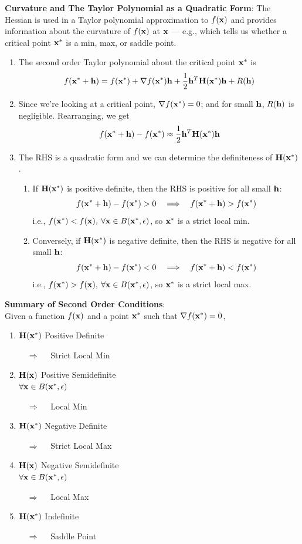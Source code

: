 \documentclass[20pt]{extarticle}
\newcommand{\be}{\begin{enumerate}}
\newcommand{\ee}{\end{enumerate}}
\newcommand{\lra}{\Longrightarrow}
\newcommand{\pbt}{\parbox[t]{2in}}
\newcommand{\eps}{\epsilon}
\newcommand{\bfx}{{\bf x}}
\newcommand{\fx}{f(\bfx)}
\begin{document}
\newcommand{\bfh}{{\bf h}}
\item {\bf Curvature and The Taylor Polynomial as a Quadratic Form}:
The Hessian is used in a Taylor polynomial approximation to $\fx$ and
provides information about the curvature of $\fx$ at $\bfx$ --- e.g., which
tells us whether a critical point $\bfx^*$ is a min, max, or saddle point.
  \be
  \item The second order Taylor polynomial about the critical point
$\bfx^*$ is
  $$f(\bfx^*+\bfh)=f(\bfx^*)+\nabla f(\bfx^*) \bfh +\frac{1}{2} \bfh^T
{\bf H(x^*)} \bfh + R(\bfh)$$
  \item Since we're looking at a critical point, $\nabla f(\bfx^*)=0$;
and for small $\bfh$, $R(\bfh)$ is negligible.  Rearranging, we get
$$f(\bfx^*+\bfh)-f(\bfx^*)\approx \frac{1}{2} \bfh^T {\bf H(x^*)}
\bfh $$
  \item The RHS is a quadratic form and we can determine the definiteness of $\bf
H(x^*)$.\\
    \be
    \item If $\bf H(x^*)$ is positive definite, then the RHS is positive
for all small $\bfh$:
$$f(\bfx^*+\bfh)-f(\bfx^*)>0 \quad\lra\quad f(\bfx^*+\bfh)>f(\bfx^*)$$
i.e., $f(\bfx^*)<f(\bfx), \: \forall \bfx\in B(\bfx^*,\eps)$, so
$\bfx^*$ is a strict local min.\\
    \item Conversely, if $\bf H(x^*)$ is negative definite, then the RHS
is negative for all small $\bfh$:
$$f(\bfx^*+\bfh)-f(\bfx^*)<0 \quad\lra\quad f(\bfx^*+\bfh)<f(\bfx^*)$$
i.e., $f(\bfx^*)>f(\bfx), \: \forall \bfx\in B(\bfx^*,\eps)$, so
$\bfx^*$ is a strict local max.\\
    \ee
  \ee

\smallskip

\item {\bf Summary of Second Order Conditions}:\\[6pt]
Given a function $\fx$ and a point $\bfx^*$ such that $\nabla
f(\bfx^*)=0$,
  \be
  \item \pbt{$\bf H(x^*)$ Positive Definite} $\quad \lra \quad$
  Strict Local Min
  \item \pbt{$\bf H(x)$ Positive Semidefinite\\ $\forall \bfx\in
B(\bfx^*,\eps)$} $\quad \lra \quad$
  Local Min
  \item \pbt{$\bf H(x^*)$ Negative Definite} $\quad \lra \quad$
  Strict Local Max
  \item \pbt{$\bf H(x)$ Negative Semidefinite\\ $\forall \bfx\in
B(\bfx^*,\eps)$} $\quad \lra \quad$
  Local Max
  \item \pbt{$\bf H(x^*)$ Indefinite} $\quad \lra \quad$
  Saddle Point
  \ee
\end{document}
